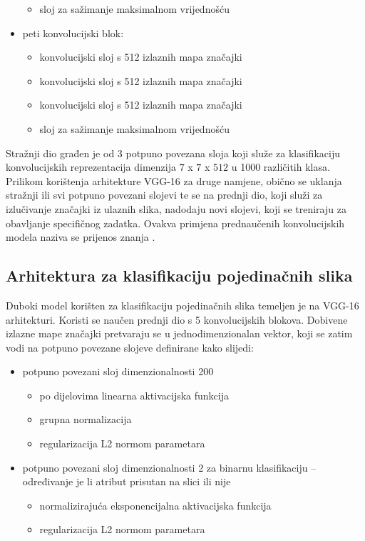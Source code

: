 \documentclass[times, utf8, diplomski, numeric]{fer}
\begin{document}
\begin{itemize}
\begin{itemize}
  \item sloj za sažimanje maksimalnom vrijednošću
 \end{itemize}
     \item peti konvolucijski blok:
 \begin{itemize}
  \item konvolucijski sloj s 512 izlaznih mapa značajki
  \item konvolucijski sloj s 512 izlaznih mapa značajki
  \item konvolucijski sloj s 512 izlaznih mapa značajki
  \item sloj za sažimanje maksimalnom vrijednošću
 \end{itemize}
\end{itemize}

Stražnji dio građen je od  3 potpuno povezana sloja koji služe za klasifikaciju konvolucijskih reprezentacija dimenzija $7$ x $7$ x $512$ u 1000 različitih klasa. 
Prilikom korištenja arhitekture VGG-16 za druge namjene, obično se uklanja stražnji ili svi potpuno povezani slojevi te se na prednji dio, koji služi za izlučivanje značajki iz ulaznih slika, nadodaju novi slojevi, koji se treniraju za obavljanje specifičnog zadatka.
Ovakva primjena prednaučenih konvolucijskih modela naziva se prijenos znanja  \citep{proceeding:transfer_learning}.

\subsection{Arhitektura za klasifikaciju pojedinačnih slika}
Duboki model korišten za klasifikaciju pojedinačnih slika temeljen je na VGG-16 arhitekturi. 
Koristi se naučen prednji dio s 5 konvolucijskih blokova. 
Dobivene izlazne mape značajki pretvaraju se u jednodimenzionalan vektor, koji se zatim vodi na potpuno povezane slojeve definirane kako slijedi:
\begin{itemize}
 \item potpuno povezani sloj dimenzionalnosti 200
 \begin{itemize}
  \item po dijelovima linearna  aktivacijska funkcija
  \item grupna normalizacija 
  \item regularizacija L2 normom parametara
 \end{itemize}
 \item potpuno povezani sloj dimenzionalnosti 2 za binarnu klasifikaciju -- određivanje je li atribut prisutan na slici ili nije
 \begin{itemize}
  \item normalizirajuća eksponencijalna  aktivacijska funkcija
  \item regularizacija L2 normom parametara
 \end{itemize}
\end{itemize}
\end{document}
